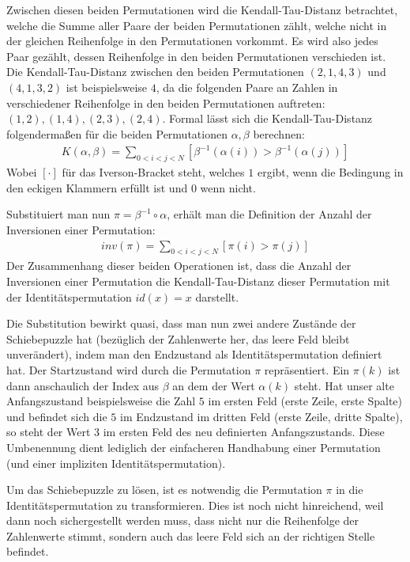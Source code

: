 \documentclass{whswinvcbook}
\begin{document}
Zwischen diesen beiden Permutationen wird die Kendall-Tau-Distanz betrachtet, welche die Summe aller Paare der beiden Permutationen zählt, welche nicht in der gleichen Reihenfolge in den Permutationen vorkommt. Es wird also jedes Paar gezählt, dessen Reihenfolge in den beiden Permutationen verschieden ist. Die Kendall-Tau-Distanz zwischen den beiden Permutationen $(2,1,4,3)$ und $(4,1,3,2)$ ist beispielsweise $4$, da die folgenden Paare an Zahlen in verschiedener Reihenfolge in den beiden Permutationen auftreten: $(1,2),(1,4),(2,3),(2,4)$. Formal lässt sich die Kendall-Tau-Distanz folgendermaßen für die beiden Permutationen $\alpha,\beta$ berechnen:\cite{sedge}
\begin{align}\label{eq-kendall}
    K(\alpha,\beta)=\sum_{0<i<j<N}\left[\beta^{-1}\left(\alpha\left(i\right)\right)>\beta^{-1}\left(\alpha\left(j\right)\right)\right]
\end{align}
Wobei $[\cdot]$ für das Iverson-Bracket steht, welches $1$ ergibt, wenn die Bedingung in den eckigen Klammern erfüllt ist und $0$ wenn nicht.

Substituiert man nun $\pi=\beta^{-1}\circ\alpha$, erhält man die Definition der Anzahl der Inversionen einer Permutation:\cite{inv}
\begin{align}\label{eq-inv}
    inv(\pi)=\sum_{0<i<j<N}[\pi(i)>\pi(j)]
\end{align}
Der Zusammenhang dieser beiden Operationen ist, dass die Anzahl der Inversionen einer Permutation die Kendall-Tau-Distanz dieser Permutation mit der Identitätspermutation $id(x)=x$ darstellt.

Die Substitution bewirkt quasi, dass man nun zwei andere Zustände der Schiebepuzzle hat (bezüglich der Zahlenwerte her, das leere Feld bleibt unverändert), indem man den Endzustand als Identitätspermutation definiert hat. Der Startzustand wird durch die Permutation $\pi$ repräsentiert. Ein $\pi(k)$ ist dann anschaulich der Index aus $\beta$ an dem der Wert $\alpha(k)$ steht. Hat unser alte Anfangszustand beispielsweise die Zahl $5$ im ersten Feld (erste Zeile, erste Spalte) und befindet sich die $5$ im Endzustand im dritten Feld (erste Zeile, dritte Spalte), so steht der Wert $3$ im ersten Feld des neu definierten Anfangszustands. Diese Umbenennung dient lediglich der einfacheren Handhabung einer Permutation (und einer impliziten Identitätspermutation).

Um das Schiebepuzzle zu lösen, ist es notwendig die Permutation $\pi$ in die Identitätspermutation zu transformieren. Dies ist noch nicht hinreichend, weil dann noch sichergestellt werden muss, dass nicht nur die Reihenfolge der Zahlenwerte stimmt, sondern auch das leere Feld sich an der richtigen Stelle befindet.
\end{document}
